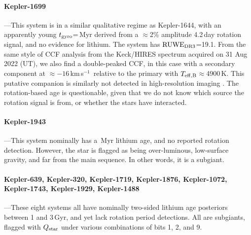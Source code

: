 \documentclass[11pt,twocolumn,tighten,linenumbers,trackchanges]{aastex63}
\newcommand{\kms}{{km\,s$^{-1}$}}
\begin{document}
\paragraph{Kepler-1699}---This system is in a similar qualitative
regime as Kepler-1644, with an apparently young $t_{\rm
gyro}$=\kepsixteenninenine\,Myr derived from a $\approx$2\% amplitude
4.2\,day rotation signal, and no evidence for lithium.  The system has
${\rm RUWE}_{\rm DR3}$=19.1.  From the same style of CCF analysis from
the Keck/HIRES spectrum acquired on 31 Aug 2022 (UT), we also find a
double-peaked CCF, in this case with a secondary component at
$\approx$$-16$\,\kms\ relative to the primary with $T_{\rm
eff,B}$$\approx$4900\,K.  This putative companion is similarly not
detected in high-resolution imaging \citep{2017AJ....153...66Z}.  The
rotation-based age is questionable, given that we do not know which
source the rotation signal is from, or whether the stars have
interacted.

\paragraph{Kepler-1943}---This system nominally has a
\kepnineteenfourthree\,Myr lithium age, and no reported rotation
detection.  However, the star is flagged as being over-luminous,
low-surface gravity, and far from the main sequence.  In other words,
it is a subgiant.

\paragraph{Kepler-639, Kepler-320, Kepler-1719, Kepler-1876,
Kepler-1072, Kepler-1743, Kepler-1929, Kepler-1488}---These eight
systems all have nominally two-sided lithium age posteriors between 1
and 3\,Gyr, and yet lack rotation period detections.  All are
subgiants, flagged with $Q_{\rm star}$ under various combinations of
bits 1, 2, and 9.


%
\end{document}
